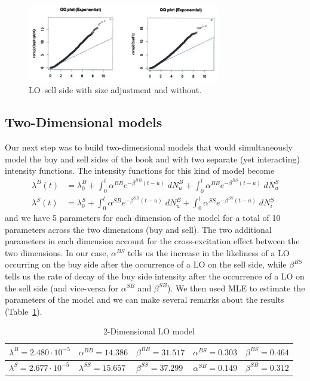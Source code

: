 	\begin{figure}[!ht]
   	\centering
   	\includegraphics[width=0.75\textwidth]{chapters/chapter_el_exch/figures/losellsideadj.png} 
   	\caption{LO--sell side with size adjustment and without. \label{fig:losellsideadj}}
	\end{figure}


\subsection{Two-Dimensional models}


Our next step was to build two-dimensional models that would simultaneously model the buy and sell sides of the book and with two separate (yet interacting) intensity functions. The intensity functions for this kind of model become
	\[
	\begin{split}
	\lambda^B(t)&= \lambda_0^B + \int_0^t \alpha^{BB} e^{-\beta^{BB}(t-u)} \;dN_u^B + \int_0^t \alpha^{BB} e^{-\beta^{BS}(t-u)} \;dN_u^S \\
	\lambda^S(t)&= \lambda_0^S + \int_0^t \alpha^{SB} e^{-\beta^{SB}(t-u)} \; dN_u^B + \int_0^t \alpha^{SS} e^{-\beta^{SS}(t-u)} \;dN_i^S
	\end{split}
	\]
and we have 5 parameters for each dimension of the model for a total of 10 parameters across the two dimensions (buy and sell). The two additional parameters in each dimension account for the cross-excitation effect between the two dimensions. In our case, $\alpha^{BS}$ tells us the increase in the likeliness of a LO occurring on the buy side after the occurrence of a LO on the sell side, while $\beta^{BS}$ tells us the rate of decay of the buy side intensity after the occurrence of a LO on the sell side (and vice-versa for $\alpha^{SB}$ and $\beta^{SB}$). We then used MLE to estimate the parameters of the model and we can make several remarks about the results (Table~\ref{tab:2dimlomodel}).
	\begin{table}
	\centering
	\caption{2-Dimensional LO model \label{tab:2dimlomodel}}
	\begin{tabular}{lllll}  
	$\lambda^B=2.480 \cdot 10^{-5}$ & $\alpha^{BB}=14.386$ & $\beta^{BB}=31.517$ & $\alpha^{BS}=0.303$ & $\beta^{BS}=0.464$ \\ \hline
	$\lambda^S=2.677 \cdot 10^{-5}$ & $\lambda^{SS}=15.657$ & $\beta^{SS}=37.299$ & $\alpha^{SB}=0.149$ & $\beta^{SB}=0.312$ \\ 
	\end{tabular}
	\end{table}
	
